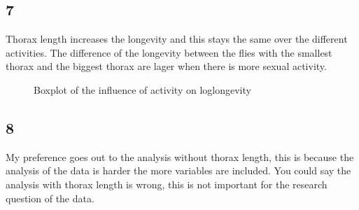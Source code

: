 \documentclass{article}
\begin{document}
    \subsection*{7}
      Thorax length increases the longevity and this stays the same over the different activities.
      The difference of the longevity between the flies with the smallest thorax and the biggest thorax are lager when there is more sexual activity.
      \begin{figure}[H]
          \centering
          \caption{Boxplot of the influence of activity on loglongevity}
          \label{fig:BoxActivity}
      \end{figure}

    \subsection*{8}
      My preference goes out to the analysis without thorax length, this is because the analysis of the data is harder the more variables are included. You could say the analysis with thorax length is wrong, this is not important for the research question of the data.
\end{document}
